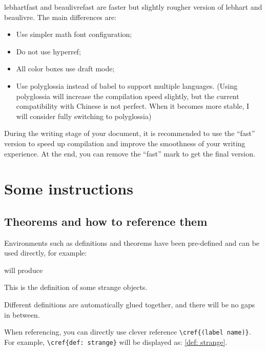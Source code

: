 \documentclass{lebhart}
\providecommand{\lebhart}{\textsf{lebh\-art}}
\providecommand{\lebhartfast}{\textsf{lebh\-art\-fast}}
\providecommand{\beaulivre}{\textsf{beau\-livre}}
\providecommand{\beaulivrefast}{\textsf{beau\-livre\-fast}}
\begin{document}
\lebhartfast{} and \beaulivrefast{} are faster but slightly rougher version of \lebhart{} and \beaulivre{}. The main differences are:
\begin{itemize}
    \item Use simpler math font configuration; 
    \item Do not use hyperref; 
    \item All color boxes use draft mode; 
    \item Use polyglossia instead of babel to support multiple languages. (Using polyglossia will increase the compilation speed slightly, but the current compatibility with Chinese is not perfect. When it becomes more stable, I will consider fully switching to polyglossia)
\end{itemize}

During the writing stage of your document, it is recommended to use the ``fast'' version to speed up compilation and improve the smoothness of your writing experience. At the end, you can remove the ``fast'' mark to get the final version.

\section{Some instructions}

\subsection{Theorems and how to reference them}

Environments such as definitions and theorems have been pre-defined and can be used directly, for example:

\begin{definition}
    Different definitions are automatically glued together, and there will be no gaps in between.
\end{definition}

When referencing, you can directly use clever reference \lstinline|\cref{(label name)}|. For example, \lstinline|\cref{def: strange}| will be displayed as: \cref{def: strange}.
\end{document}
